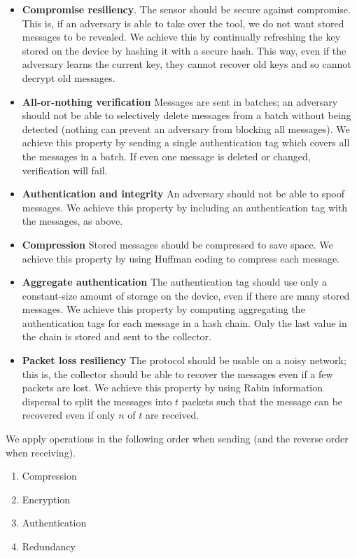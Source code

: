 \documentclass[10pt]{article}
\begin{document}
\begin{itemize}
\item \textbf{Compromise resiliency}. The sensor should be secure against compromise. This is, if an adversary is able to take over the tool, we do not want stored messages to be revealed. We achieve this by continually refreshing the key stored on the device by hashing it with a secure hash. This way, even if the adversary learns the current key, they cannot recover old keys and so cannot decrypt old messages.
\item \textbf{All-or-nothing verification}
Messages are sent in batches; an adversary should not be able to selectively delete messages from a batch without being detected (nothing can prevent an adversary from blocking all messages). We achieve this property by sending a single authentication tag which covers all the messages in a batch. If even one message is deleted or changed, verification will fail.
\item \textbf{Authentication and integrity}
An adversary should not be able to spoof messages. We achieve this property by including an authentication tag with the messages, as above.
\item \textbf{Compression}
Stored messages should be compressed to save space. We achieve this property by using Huffman coding to compress each message.
\item \textbf{Aggregate authentication}
The authentication tag should use only a constant-size amount of storage on the device, even if there are many stored messages. We achieve this property by computing aggregating the authentication tags for each message in a hash chain. Only the last value in the chain is stored and sent to the collector.
\item \textbf{Packet loss resiliency}
The protocol should be usable on a noisy network; this is, the collector should be able to recover the messages even if a few packets are lost. We achieve this property by using Rabin information dispersal to split the messages into $t$ packets such that the message can be recovered even if only $n$ of $t$ are received.
\end{itemize}

We apply operations in the following order when sending (and the reverse order when receiving).
\begin{enumerate}
\item Compression
\item Encryption
\item Authentication
\item Redundancy
\end{enumerate}
\end{document}
